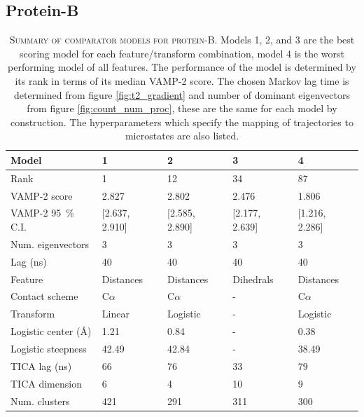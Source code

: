 \documentclass{article}
\begin{document}
\clearpage
\subsection{Protein-B}
\begin{table}[h]
    \centering
    \begin{tabular}{lllll}
    \toprule
    Model &               1 &               2 &               3 &               4 \\
    \midrule
    Rank                             &               1 &              12 &              34 &              87 \\
    VAMP-2 score                     &           2.827 &           2.802 &           2.476 &           1.806 \\
    VAMP-2 \SI{95}{\percent} C.I.    &  [2.637, 2.910] &  [2.585, 2.890] &  [2.177, 2.639] &  [1.216, 2.286] \\
    Num. eigenvectors                &               3 &               3 &               3 &               3 \\
    Lag (ns)                         &              40 &              40 &              40 &              40 \\
    Feature                          &       Distances &       Distances &       Dihedrals &       Distances \\
    Contact scheme                   &       C$\alpha$ &       C$\alpha$ &               - &       C$\alpha$ \\
    Transform                        &          Linear &        Logistic &               - &        Logistic \\
    Logistic center (\si{\angstrom}) &            1.21 &            0.84 &               - &            0.38 \\
    Logistic steepness               &           42.49 &           42.84 &               - &           38.49 \\
    TICA lag (ns)                    &              66 &              76 &              33 &              79 \\
    TICA dimension                   &               6 &               4 &              10 &               9 \\
    Num. clusters                    &             421 &             291 &             311 &             300 \\
    \bottomrule
    \end{tabular}
    \caption{\textsc{Summary of comparator models for protein-B.} Models 1, 2, and 3 are the best scoring model for each feature/transform combination, model 4 is the worst performing model of all features.  The performance of the model is determined by its rank in terms of its median VAMP-2 score.  The chosen Markov lag time is determined from figure \ref{fig:t2_gradient} and number of dominant eigenvectors from figure \ref{fig:count_num_proc}, these are the same for each model by construction. The hyperparameters which specify the mapping of trajectories to microstates are also listed.}
    \label{tab:prb_mod_defs}
\end{table}
\end{document}
